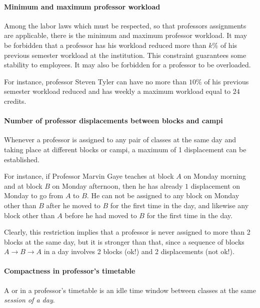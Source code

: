 \paragraph{Minimum and maximum professor workload}
\label{constrminmaxworkload}

Among the labor laws which must be respected, so that professors assignments are applicable, there is the minimum and maximum professor workload. It may be forbidden that a professor has his workload reduced more than $k\%$ of his previous semester workload at the institution. This constraint guarantees some stability to employees. It may also be forbidden for a professor to be overloaded.

For instance, professor Steven Tyler can have no more than $10\%$ of his previous semester workload reduced and has weekly a maximum workload equal to $24$ credits.


\paragraph{Number of professor displacements between blocks and campi}
\label{constrprofdisplacnum}

Whenever a professor is assigned to any pair of classes at the same day and taking place at different blocks or campi, a maximum of 1 displacement can be established.

For instance, if Professor Marvin Gaye teaches at block $A$ on Monday morning and at block $B$ on Monday afternoon, then he has already $1$ displacement on Monday to go from $A$ to $B$. He can not be assigned to any block on Monday other than $B$ after he moved to $B$ for the first time in the day, and likewise any block other than $A$ before he had moved to $B$ for the first time in the day.

Clearly, this restriction implies that a professor is never assigned to more than 2 blocks at the same day, but it is stronger than that, since a sequence of blocks $A \rightarrow B \rightarrow A$ in a day involves 2 blocks (ok!) and 2 displacements (not ok!).



\paragraph{Compactness in professor's timetable}
\label{constrmingapprof}

A  or  in a professor's timetable is an idle time window between classes at the same \textit{session of a day}.

